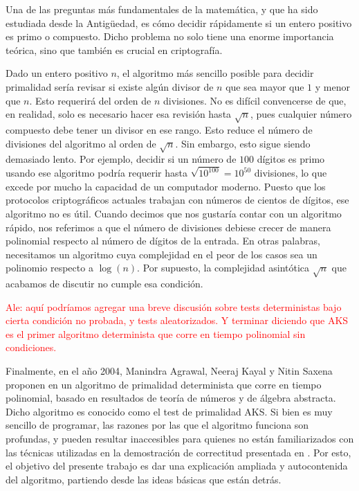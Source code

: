 Una de las preguntas más fundamentales de la matemática, y que ha sido estudiada desde la Antigüedad, es cómo decidir rápidamente si un entero positivo es primo o compuesto. Dicho problema no solo tiene una enorme importancia teórica, sino que también es crucial en criptografía.

Dado un entero positivo $n$, el algoritmo más sencillo posible para decidir primalidad sería revisar si existe algún divisor de $n$ que sea mayor que $1$ y menor que $n$. Esto requerirá del orden de $n$ divisiones. No es difícil convencerse de que, en realidad, solo es necesario hacer esa revisión hasta $\sqrt{n}$, pues cualquier número compuesto debe tener un divisor en ese rango. Esto reduce el número de divisiones del algoritmo al orden de $\sqrt{n}$. Sin embargo, esto sigue siendo demasiado lento. Por ejemplo, decidir si un número de $100$ dígitos es primo usando ese algoritmo podría requerir hasta $\sqrt{10^{100}} = 10^{50}$ divisiones, lo que excede por mucho la capacidad de un computador moderno. Puesto que los protocolos criptográficos actuales trabajan con números de cientos de dígitos, ese algoritmo no es útil. Cuando decimos que nos gustaría contar con un algoritmo rápido, nos referimos a que el número de divisiones debiese crecer de manera polinomial respecto al número de dígitos de la entrada. En otras palabras, necesitamos un algoritmo cuya complejidad en el peor de los casos sea un polinomio respecto a $\log(n)$. Por supuesto, la complejidad asintótica $\sqrt{n}$ que acabamos de discutir no cumple esa condición.


\textcolor{red}{Ale: aquí podríamos agregar una breve discusión sobre tests deterministas bajo cierta condición no probada, y tests aleatorizados. Y terminar diciendo que AKS es el primer algoritmo determinista que corre en tiempo polinomial sin condiciones.}


Finalmente, en el año 2004, Manindra Agrawal, Neeraj Kayal y Nitin Saxena proponen en \cite{AKS04} un algoritmo de primalidad determinista que corre en tiempo polinomial, basado en resultados de teorí­a de números y de álgebra abstracta. Dicho algoritmo es conocido como el test de primalidad AKS. Si bien es muy sencillo de programar, las razones por las que el algoritmo funciona son profundas, y pueden resultar inaccesibles para quienes no están familiarizados con las técnicas utilizadas en la demostración de correctitud presentada en \cite{AKS04}. Por esto, el objetivo del presente trabajo es dar una explicación ampliada y autocontenida del algoritmo, partiendo desde las ideas básicas que están detrás.
